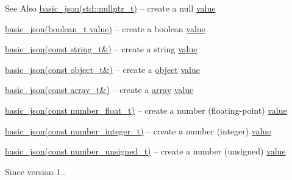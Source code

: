 \begin{DoxySeeAlso}{See Also}
\hyperlink{classnlohmann_1_1basic__json_ade0e56c8c320d7f342e7a5697e6d6f7e}{basic\-\_\-json(std\-::nullptr\-\_\-t)} -- create a {\ttfamily null} \hyperlink{classnlohmann_1_1basic__json_a0a2cbbd95862a623e7dc5c37e67dead0}{value} 

\hyperlink{classnlohmann_1_1basic__json_aac36af84d907b5c3e469af889661620a}{basic\-\_\-json(boolean\-\_\-t value)} -- create a boolean \hyperlink{classnlohmann_1_1basic__json_a0a2cbbd95862a623e7dc5c37e67dead0}{value} 

\hyperlink{classnlohmann_1_1basic__json_ab8b43d92a042dde96c28aeea81dd52de}{basic\-\_\-json(const string\-\_\-t\&)} -- create a string \hyperlink{classnlohmann_1_1basic__json_a0a2cbbd95862a623e7dc5c37e67dead0}{value} 

\hyperlink{classnlohmann_1_1basic__json_a9af5ea68c88f423ddf35216aff7f1813}{basic\-\_\-json(const object\-\_\-t\&)} -- create a \hyperlink{classnlohmann_1_1basic__json_ad25b2f8c21e241e2d63455537a9294ff}{object} \hyperlink{classnlohmann_1_1basic__json_a0a2cbbd95862a623e7dc5c37e67dead0}{value} 

\hyperlink{classnlohmann_1_1basic__json_a3aaf41d385f0d9a93deb92f9b14ae0cf}{basic\-\_\-json(const array\-\_\-t\&)} -- create a \hyperlink{classnlohmann_1_1basic__json_a5685815624b086caa532f41e853d4b0f}{array} \hyperlink{classnlohmann_1_1basic__json_a0a2cbbd95862a623e7dc5c37e67dead0}{value} 

\hyperlink{classnlohmann_1_1basic__json_a2badcf191deabf579abcf8d3654da26f}{basic\-\_\-json(const number\-\_\-float\-\_\-t)} -- create a number (floating-\/point) \hyperlink{classnlohmann_1_1basic__json_a0a2cbbd95862a623e7dc5c37e67dead0}{value} 

\hyperlink{classnlohmann_1_1basic__json_a0d838bc7ffca6017f51167e0a8ffd9b6}{basic\-\_\-json(const number\-\_\-integer\-\_\-t)} -- create a number (integer) \hyperlink{classnlohmann_1_1basic__json_a0a2cbbd95862a623e7dc5c37e67dead0}{value} 

\hyperlink{classnlohmann_1_1basic__json_a85b09b03916d3d1e73373f49cdd4136d}{basic\-\_\-json(const number\-\_\-unsigned\-\_\-t)} -- create a number (unsigned) \hyperlink{classnlohmann_1_1basic__json_a0a2cbbd95862a623e7dc5c37e67dead0}{value}
\end{DoxySeeAlso}
\begin{DoxySince}{Since}
version 1.. 
\end{DoxySince}
